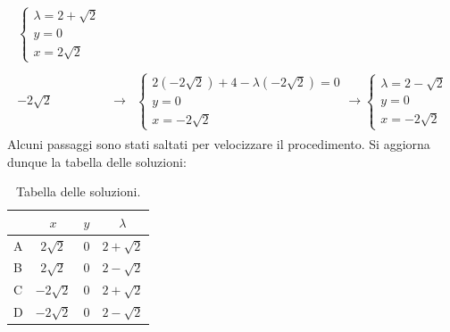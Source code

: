 \documentclass[a4paper]{article}
\begin{document}
\begin{gather*}
\begin{array}{rcl}
\begin{cases}
				\lambda = 2 + \sqrt{2} \\
				y = 0 \\
				x = 2\sqrt{2}
			\end{cases} \\
			\\
			-2\sqrt{2} &\rightarrow& \begin{cases}
				2\left(-2\sqrt{2}\right) + 4 - \lambda \left(-2\sqrt{2}\right) = 0 \\
				y = 0 \\
				x = -2\sqrt{2}
			\end{cases}
			\rightarrow
			\begin{cases}
				\lambda = 2 - \sqrt{2} \\
				y = 0 \\
				x = -2\sqrt{2}
			\end{cases}
		\end{array}
	\end{gather*}
	Alcuni passaggi sono stati saltati per velocizzare il procedimento. Si aggiorna dunque la tabella delle soluzioni:
	\begin{table}[!htp]
		\centering
		\begin{tabular}{@{} l | c | c | c @{}}
			\toprule
			& $x$ & $y$ & $\lambda$ \\
			\midrule
			A & $2\sqrt{2}$ & $0$ & $2+\sqrt{2}$ \\
			B & $2\sqrt{2}$ & $0$ & $2-\sqrt{2}$ \\
			C & $-2\sqrt{2}$ & $0$ & $2+\sqrt{2}$ \\
			D & $-2\sqrt{2}$ & $0$ & $2-\sqrt{2}$ \\
			\bottomrule
		\end{tabular}
		\caption*{Tabella delle soluzioni.}
	\end{table}\newpage
\end{document}
